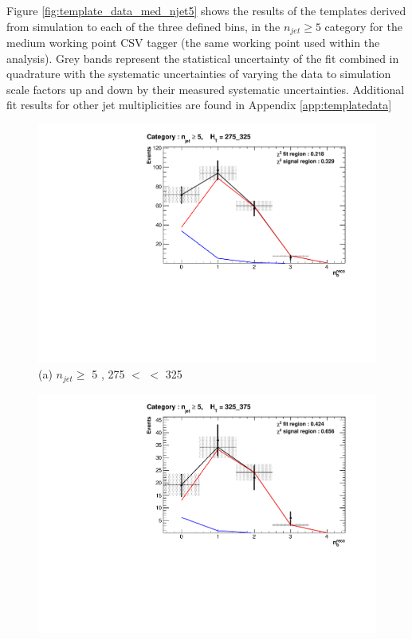 Figure \ref{fig:template_data_med_njet5} shows the results of the templates derived from simulation to each of the three defined \theht bins, in the $n_{jet} \geq 5$ category for the medium working point \ac{CSV} tagger (the same working point used within the \alphat analysis).  Grey bands represent the statistical uncertainty of the fit combined in quadrature with the systematic uncertainties of varying the data to simulation scale factors up and down by their measured systematic uncertainties.  Additional fit results for other jet multiplicities are found in Appendix \ref{app:templatedata}  

\begin{figure}[ht]
\footnotesize
\centering
\begin{minipage}[b]{0.51 \linewidth}
\includegraphics[width = 1.0\linewidth]{plots/ThesisPlots/Final_Fit_To_Data_Normal_Medium_HTBin_OneMuon_275_325_jet_mult_5.pdf}
\centering (a) $n_{jet} \geq$  5 , 275 $<$ \theht $<$ 325
\end{minipage}
\quad
\begin{minipage}[b]{0.51\linewidth}
\includegraphics[width = 1.0\linewidth]{plots/ThesisPlots/Final_Fit_To_Data_Normal_Medium_HTBin_OneMuon_325_375_jet_mult_5.pdf}

\end{minipage}
\end{figure}
